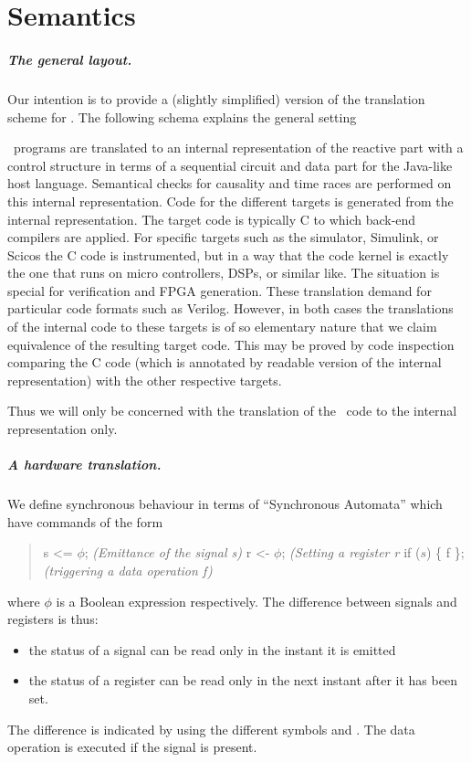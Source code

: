 \chapter{Semantics}\label{semantics}

\paragraph{The general layout.}

Our intention is to provide a (slightly simplified) version of the
translation scheme for \se. The following schema explains the general
setting

\se\ programs are translated to an internal representation of the 
reactive part with a control structure in terms of a sequential
circuit and data part for the Java-like host language. Semantical
checks for causality and time races are performed on this internal
representation. Code for the different targets is generated from the
internal representation. The target code is typically C to which
back-end compilers are applied. For specific targets such as the
simulator, Simulink, or Scicos the C code is instrumented, but in a way
that the code kernel is exactly the one that runs on micro controllers,
DSPs, or similar like. The situation is special for verification and
FPGA generation. These translation demand for particular code formats
such as Verilog. However, in both cases the translations of the internal
code to these targets is of so elementary nature that we claim equivalence
of the resulting target code. This may be proved by code inspection comparing
the C code (which is annotated by readable version of the internal representation) with the other respective targets.

Thus we will only be concerned with the translation of the \se\ code
to the internal representation only.

\paragraph{A hardware translation.}

We define synchronous behaviour in terms of ``Synchronous Automata''
which have commands of the form
\begin{quote} 
\BEP
s <= $\phi$;          \textit{(Emittance of the signal \emph{s})}
r <- $\phi$;          \textit{(Setting a register \emph{r}} 
if ($s$)  $\!$\{ f \};    \textit{(triggering a data operation \emph{f})}
\EEP
\end{quote}
where $\phi$ is a Boolean expression respectively. The difference between
signals and registers is thus:
\begin{itemize}
\item the status of a signal can be read only in the instant it is emitted
\item the status of a register can be read only in the next instant after it has been set.
\end{itemize}
The difference is indicated by using the different symbols \pp{<=} and
\pp{<-}. The data operation  is executed if the signal  is present.

